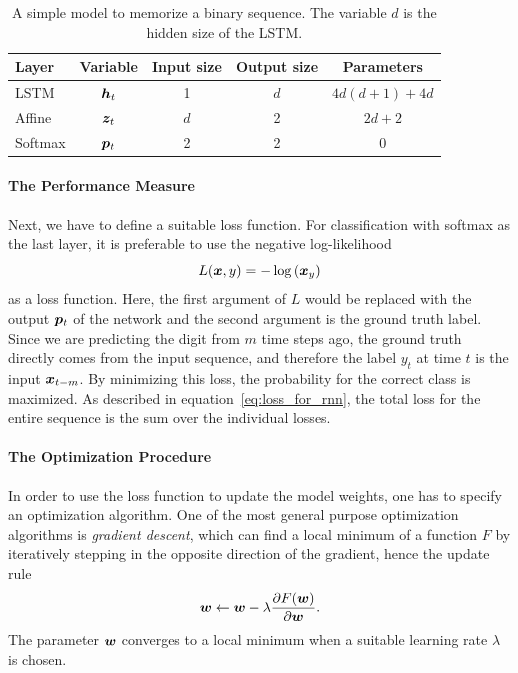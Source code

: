 		\begin{table}[tb]
			\small
			\begin{center}
				\begin{tabular}{|l|c|c|c|c|}
					\hline
					Layer 	& Variable 			& Input size 	& Output size 	& Parameters 			\\ \hline
					LSTM 	& $\bm{h}_t$		& 1 			& $d$ 			& $4d(d + 1) + 4d$ 		\\ \hline
					Affine 	& $\bm{z}_t$		& $d$ 			& 2 			& $2d + 2$ 				\\ \hline
					Softmax & $\bm{p}_t$		& 2 			& 2 			& 0						\\ \hline
				\end{tabular}
			\end{center}
			\caption[A simple model to memorize a binary sequence]
					{A simple model to memorize a binary sequence. 
					 The variable $d$ is the hidden size of the LSTM.}
			\label{tbl:model_classification_binary_digits}
		\end{table}
		
		\paragraph{The Performance Measure}
		Next, we have to define a suitable loss function. 
		For classification with softmax as the last layer, it is preferable to use the negative log-likelihood
		\begin{equation}
			L(\bm{x}, y) = -\log\left(\bm{x}_y\right)
		\end{equation}
		as a loss function. 
		Here, the first argument of $L$ would be replaced with the output $\bm{p}_t$ of the network and the second argument is the ground truth label. 
		Since we are predicting the digit from $m$ time steps ago, the ground truth directly comes from the input sequence, and therefore the label $y_t$ at time $t$ is the input $\bm{x}_{t - m}$.
		By minimizing this loss, the probability for the correct class is maximized.
		As described in equation~\ref{eq:loss_for_rnn}, the total loss for the entire sequence is the sum over the individual losses.
		
		\paragraph{The Optimization Procedure}
		In order to use the loss function to update the model weights, one has to specify an optimization algorithm.
		One of the most general purpose optimization algorithms is \emph{gradient descent}, which can find a local minimum of a function $F$ by iteratively stepping in the opposite direction of the gradient, hence the update rule
		\begin{equation}
			\bm{w} \leftarrow 
			\bm{w} - \lambda \frac{\partial F(\bm{w})}{\partial \bm{w}}.
		\end{equation}
		The parameter $\bm{w}$ converges to a local minimum when a suitable learning rate $\lambda$ is chosen.
		
